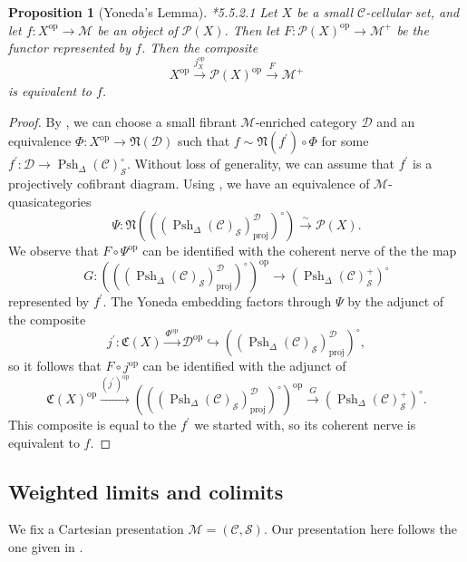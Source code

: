 \documentclass[leqno]{article}
\numberwithin{equation}{subsection}
\theoremstyle{plain}   %
\newtheorem{prop}[equation]{Proposition}
\theoremstyle{remark}
\theoremstyle{plain}
\newcommand{\op}{\ensuremath{\mathrm{op}}}
\providecommand{\C}{}
\renewcommand{\C}{\ensuremath{\mathcal{C}}}
\newcommand{\M}{\ensuremath{\mathcal{M}}}
\newcommand{\Pre}{\ensuremath{\mathcal{P}}}
\newcommand{\setS}{\ensuremath{\mathscr{S}}}
\newcommand{\spsh}{\ensuremath{\operatorname{Psh}_\Delta(\mathcal{C})}}
\begin{document}
\begin{prop}[Yoneda's Lemma]\cite{htt}*{5.5.2.1}
	Let \(X\) be a small \(\C\)-cellular set, and let \(f: X^\op \to \M\) be an object of \(\Pre(X)\).  Then let \(F:\Pre(X)^\op \to \M^+\) be the functor represented by \(f\).  Then the composite \[X^\op\xrightarrow{j^\op_X} \Pre(X)^\op \xrightarrow{F} \M^+\] is equivalent to \(f\).
\end{prop}
\begin{proof}
	By , we can choose a small fibrant \(\M\)-enriched category \(\mathcal{D}\) and an equivalence \(\Phi:X^\op\to \mathfrak{N}(\mathcal{D})\) such that \(f\sim \mathfrak{N}(f^\prime) \circ \Phi\) for some \(f^\prime:\mathcal{D} \to \spsh_\setS^\circ\).  Without loss of generality, we can assume that \(f^\prime\) is a projectively cofibrant diagram.  Using , we have an equivalence of \(\M\)-quasicategories 
	\[\Psi:\mathfrak{N}\left(\left((\spsh_\setS)_\mathrm{proj}^\mathcal{D}\right)^\circ\right) \xrightarrow{\sim} \Pre(X).\] 
	We observe that \(F\circ \Psi^\op\) can be identified with the coherent nerve of the the map 
	\[G: \left(\left((\spsh_\setS)_\mathrm{proj}^\mathcal{D}\right)^\circ\right)^\op \to \left(\spsh^{+}_\setS\right)^\circ\] represented by \(f^\prime\).  The Yoneda embedding factors through \(\Psi\) by the adjunct of the composite 
	\[j^\prime:\mathfrak{C}(X)\xrightarrow{\Phi^\op} \mathcal{D}^\op \hookrightarrow \left((\spsh_\setS)_\mathrm{proj}^\mathcal{D}\right)^\circ,\]
	so it follows that \(F\circ j^\op\) can be identified with the adjunct of 
	\[\mathfrak{C}(X)^\op \xrightarrow{(j^\prime)^\op} \left(\left((\spsh_\setS)_\mathrm{proj}^\mathcal{D}\right)^\circ\right)^\op \xrightarrow{G} \left(\spsh^{+}_\setS\right)^\circ.\]
	This composite is equal to the \(f^\prime\) we started with, so its coherent nerve is equivalent to \(f\).
\end{proof}

\subsection{Weighted limits and colimits}
We fix a Cartesian presentation \(\M=(\C,\setS)\).  Our presentation here follows the one given in \cite{nlabwlim}.
\end{document}
